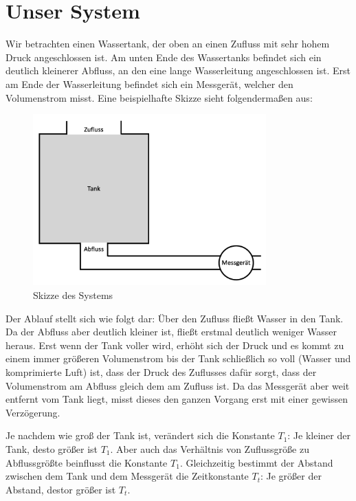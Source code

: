 \section{Unser System}
Wir betrachten einen Wassertank, der oben an einen Zufluss mit sehr hohem Druck angeschlossen ist. Am unten Ende des Wassertanks befindet sich ein deutlich kleinerer Abfluss, an den eine lange Wasserleitung angeschlossen ist. Erst am Ende der Wasserleitung befindet sich ein Messgerät, welcher den Volumenstrom misst.
Eine beispielhafte Skizze sieht folgendermaßen aus:
\begin{figure}[H]
    \label{fig:tank}
    \centering
    \includegraphics[width=0.8\textwidth]{Bilder/Tank.png}
    \caption{Skizze des Systems}
 \end{figure}
Der Ablauf stellt sich wie folgt dar: Über den Zufluss fließt Wasser in den Tank. Da der Abfluss aber deutlich kleiner ist, fließt erstmal deutlich weniger Wasser heraus. Erst wenn der Tank voller wird, erhöht sich der Druck und es kommt zu einem immer größeren Volumenstrom bis der Tank schließlich so voll (Wasser und komprimierte Luft) ist, dass der Druck des Zuflusses dafür sorgt, dass der Volumenstrom am Abfluss gleich dem am Zufluss ist. Da das Messgerät aber weit entfernt vom Tank liegt, misst dieses den ganzen Vorgang erst mit einer gewissen Verzögerung.

Je nachdem wie groß der Tank ist, verändert sich die Konstante $T_1$: Je kleiner der Tank, desto größer ist $T_1$. Aber auch das Verhältnis von Zuflussgröße zu Abflussgrößte beinflusst die Konstante $T_1$. Gleichzeitig bestimmt der Abstand zwischen dem Tank und dem Messgerät die Zeitkonstante $T_t$: Je größer der Abstand, destor größer ist $T_t$.

